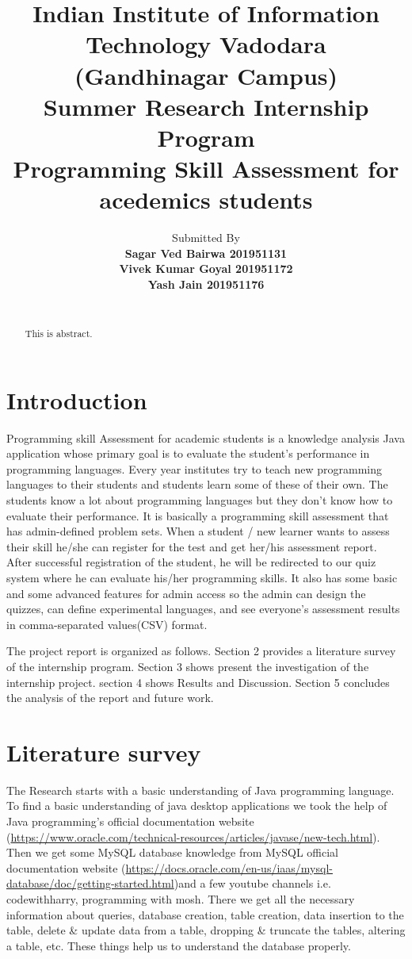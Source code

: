 \documentclass[10pt,a4paper,openright]{IEEEtran}
\title {\LARGE{ \textbf{  \quad  Indian Institute of Information Technology Vadodara\\ (Gandhinagar Campus) \\[5mm] \LARGE { Summer Research Internship Program } \\ [5mm] \large{Programming Skill Assessment for acedemics students} }} }
\author{ Submitted By \\[2mm]
	\textbf{
	Sagar Ved Bairwa 201951131
	\\
	Vivek Kumar Goyal 201951172
	\\
	Yash Jain 201951176
	}
	\\[2mm]
	\hrule
	
	 
	
}
\begin{document}
\maketitle
\begin{abstract}
	This is abstract.
\end{abstract}

%	
\section{Introduction}
 Programming skill Assessment for academic students is a knowledge analysis Java application whose primary goal is to evaluate the student's performance in programming languages. Every year institutes try to teach new programming languages to their students and students learn some of these of their own. The students know a lot about programming languages but they don’t know how to evaluate their performance. It is basically a programming skill assessment that has admin-defined problem sets. When a student / new learner wants to assess their skill he/she can register for the test and get her/his assessment report. After successful registration of the student, he will be redirected to our quiz system where he can evaluate his/her programming skills. It also has some basic and some advanced features for admin access so the admin can design the quizzes, can define experimental languages, and see everyone's assessment results in comma-separated values(CSV) format. 

The project report is organized as follows. Section 2 provides a literature survey of the internship program. Section 3 shows present the investigation of the internship project. section 4 shows Results and Discussion. Section 5 concludes the analysis of the report and future work.


\section{Literature survey}
The Research starts with a basic understanding of Java programming language. To find a basic understanding of java desktop applications we took the help of Java programming’s official documentation website (\href{https://www.oracle.com/technical-resources/articles/javase/new-tech.html}{https://www.oracle.com/technical-resources/articles/javase/new-tech.html}). Then we get some MySQL database knowledge from MySQL official documentation website (\href{https://docs.oracle.com/en-us/iaas/mysql-database/doc/getting-started.html}{https://docs.oracle.com/en-us/iaas/mysql-database/doc/getting-started.html})and a few youtube channels i.e. codewithharry, programming with mosh. There we get all the necessary information about queries, database creation, table creation, data insertion to the table, delete \& update data from a table, dropping \& truncate the tables, altering a table, etc. These things help us to understand the database properly.
\end{document}
